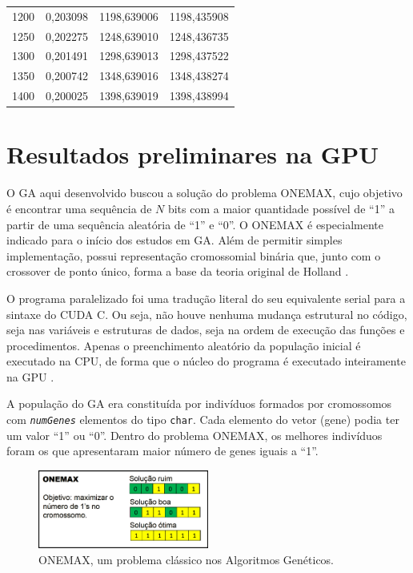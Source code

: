 \begin{table}[htbp]
\begin{tabular}{rrrr}
      1200 &   0,203098 & 1198,639006 & 1198,435908 \\

      1250 &   0,202275 & 1248,639010 & 1248,436735 \\

      1300 &   0,201491 & 1298,639013 & 1298,437522 \\

      1350 &   0,200742 & 1348,639016 & 1348,438274 \\

      1400 &   0,200025 & 1398,639019 & 1398,438994 \\
\hline
\end{tabular}  
\end{table}


\newpage		
\section{Resultados preliminares na GPU}\label{sec:oneMaxNaGPU}
	
		O GA aqui desenvolvido buscou a solução do problema ONEMAX, cujo objetivo é encontrar uma sequência de $N$ bits com a maior quantidade possível de “1” a partir de uma sequência aleatória de “1” e “0”. O ONEMAX é especialmente indicado para o início dos estudos em GA. Além de permitir simples implementação, possui representação cromossomial binária que, junto com o crossover de ponto único, forma a base da teoria original de Holland \cite{Linden2008}.

	O programa paralelizado foi uma tradução literal do seu equivalente serial para a sintaxe do CUDA C. Ou seja, não houve nenhuma mudança estrutural no código, seja nas variáveis e estruturas de dados, seja na ordem de execução das funções e procedimentos. Apenas o preenchimento aleatório da população inicial é executado na CPU, de forma que o núcleo do programa é executado inteiramente na GPU \cite{onemaxNaGPU}. 

	A população do GA era constituída por indivíduos formados por cromossomos com \textit{\texttt{numGenes}} elementos do tipo \texttt{char}. Cada elemento do vetor (gene) podia ter um valor  “1” ou “0”. Dentro do problema ONEMAX, os melhores indivíduos foram os que apresentaram maior número de genes iguais a “1”.
		
	\begin{figure}[htbp]
		\centering
			\includegraphics[width=0.50\textwidth]{figs/resultados/onemax/onemax_objetivo.png}
		\caption{ONEMAX, um problema clássico nos Algoritmos Genéticos.}
		\label{fig:onemax_objetivo}
	\end{figure}
		
